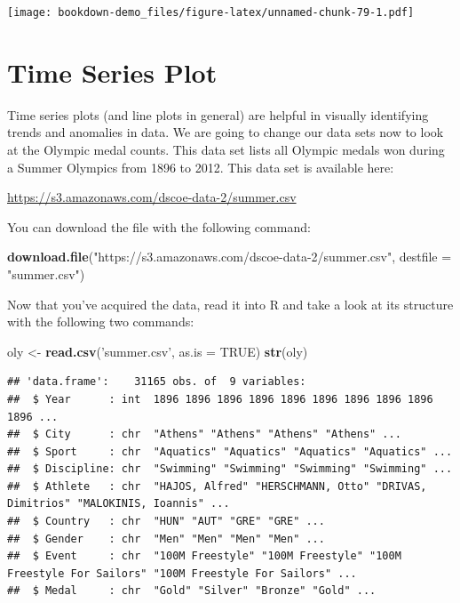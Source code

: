 \documentclass[]{book}
\newenvironment{Shaded}{\begin{snugshade}}{\end{snugshade}}
\newcommand{\KeywordTok}[1]{\textcolor[rgb]{0.13,0.29,0.53}{\textbf{{#1}}}}
\newcommand{\DataTypeTok}[1]{\textcolor[rgb]{0.13,0.29,0.53}{{#1}}}
\newcommand{\StringTok}[1]{\textcolor[rgb]{0.31,0.60,0.02}{{#1}}}
\newcommand{\OtherTok}[1]{\textcolor[rgb]{0.56,0.35,0.01}{{#1}}}
\newcommand{\NormalTok}[1]{{#1}}
\begin{document}
\texttt{[image: bookdown-demo\_files/figure-latex/unnamed-chunk-79-1.pdf]}

\section{Time Series Plot}\label{time-series-plot}

Time series plots (and line plots in general) are helpful in visually
identifying trends and anomalies in data. We are going to change our
data sets now to look at the Olympic medal counts. This data set lists
all Olympic medals won during a Summer Olympics from 1896 to 2012. This
data set is available here:

\url{https://s3.amazonaws.com/dscoe-data-2/summer.csv}

You can download the file with the following command:

\begin{Shaded}
\begin{Highlighting}[]
\KeywordTok{download.file}\NormalTok{(}\StringTok{"https://s3.amazonaws.com/dscoe-data-2/summer.csv"}\NormalTok{, }
              \DataTypeTok{destfile =} \StringTok{"summer.csv"}\NormalTok{)}
\end{Highlighting}
\end{Shaded}

Now that you've acquired the data, read it into R and take a look at its
structure with the following two commands:

\begin{Shaded}
\begin{Highlighting}[]
\NormalTok{oly <-}\StringTok{ }\KeywordTok{read.csv}\NormalTok{(}\StringTok{'summer.csv'}\NormalTok{, }\DataTypeTok{as.is =} \OtherTok{TRUE}\NormalTok{)}
\KeywordTok{str}\NormalTok{(oly)}
\end{Highlighting}
\end{Shaded}

\begin{verbatim}
## 'data.frame':    31165 obs. of  9 variables:
##  $ Year      : int  1896 1896 1896 1896 1896 1896 1896 1896 1896 1896 ...
##  $ City      : chr  "Athens" "Athens" "Athens" "Athens" ...
##  $ Sport     : chr  "Aquatics" "Aquatics" "Aquatics" "Aquatics" ...
##  $ Discipline: chr  "Swimming" "Swimming" "Swimming" "Swimming" ...
##  $ Athlete   : chr  "HAJOS, Alfred" "HERSCHMANN, Otto" "DRIVAS, Dimitrios" "MALOKINIS, Ioannis" ...
##  $ Country   : chr  "HUN" "AUT" "GRE" "GRE" ...
##  $ Gender    : chr  "Men" "Men" "Men" "Men" ...
##  $ Event     : chr  "100M Freestyle" "100M Freestyle" "100M Freestyle For Sailors" "100M Freestyle For Sailors" ...
##  $ Medal     : chr  "Gold" "Silver" "Bronze" "Gold" ...
\end{verbatim}
\end{document}
